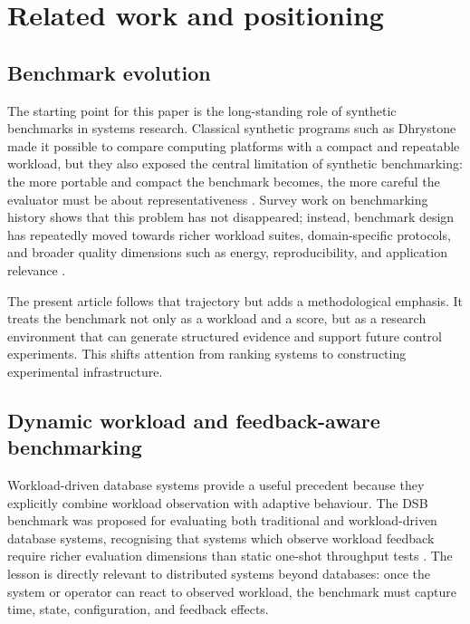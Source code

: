 \documentclass[11pt,a4paper]{article}
\begin{document}
\section{Related work and positioning}
\label{sec:related}

\subsection{Benchmark evolution}
\label{subsec:related-benchmark-evolution}

The starting point for this paper is the long-standing role of synthetic benchmarks in systems research. Classical synthetic programs such as Dhrystone made it possible to compare computing platforms with a compact and repeatable workload, but they also exposed the central limitation of synthetic benchmarking: the more portable and compact the benchmark becomes, the more careful the evaluator must be about representativeness \cite{weicker1984dhrystone}. Survey work on benchmarking history shows that this problem has not disappeared; instead, benchmark design has repeatedly moved towards richer workload suites, domain-specific protocols, and broader quality dimensions such as energy, reproducibility, and application relevance \cite{mdpi2025benchmarking}.

The present article follows that trajectory but adds a methodological emphasis. It treats the benchmark not only as a workload and a score, but as a research environment that can generate structured evidence and support future control experiments. This shifts attention from ranking systems to constructing experimental infrastructure.

\subsection{Dynamic workload and feedback-aware benchmarking}
\label{subsec:related-dynamic-workload}

Workload-driven database systems provide a useful precedent because they explicitly combine workload observation with adaptive behaviour. The DSB benchmark was proposed for evaluating both traditional and workload-driven database systems, recognising that systems which observe workload feedback require richer evaluation dimensions than static one-shot throughput tests \cite{dsb2021paper,microsoft2026dsb}. The lesson is directly relevant to distributed systems beyond databases: once the system or operator can react to observed workload, the benchmark must capture time, state, configuration, and feedback effects.
\end{document}
